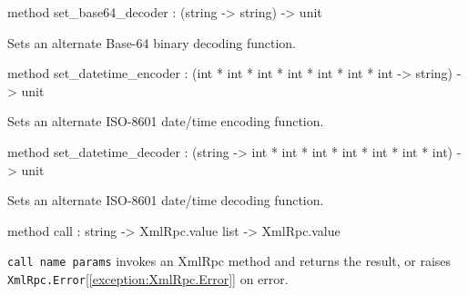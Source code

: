 \documentclass[11pt]{article}
\begin{document}
\begin{ocamldocobjectend}
\begin{ocamldocdescription}
\end{ocamldocdescription}


\label{method:XmlRpc.client.set-underscorebase64-underscoredecoder}\begin{ocamldoccode}
method set_base64_decoder : (string -> string) -> unit
\end{ocamldoccode}
\begin{ocamldocdescription}
Sets an alternate Base-64 binary decoding function.


\end{ocamldocdescription}


\label{method:XmlRpc.client.set-underscoredatetime-underscoreencoder}\begin{ocamldoccode}
method set_datetime_encoder :
  (int * int * int * int * int * int * int -> string) -> unit
\end{ocamldoccode}
\begin{ocamldocdescription}
Sets an alternate ISO-8601 date/time encoding function.


\end{ocamldocdescription}


\label{method:XmlRpc.client.set-underscoredatetime-underscoredecoder}\begin{ocamldoccode}
method set_datetime_decoder :
  (string -> int * int * int * int * int * int * int) -> unit
\end{ocamldoccode}
\begin{ocamldocdescription}
Sets an alternate ISO-8601 date/time decoding function.


\end{ocamldocdescription}


\label{method:XmlRpc.client.call}\begin{ocamldoccode}
method call : string -> XmlRpc.value list -> XmlRpc.value
\end{ocamldoccode}
\begin{ocamldocdescription}
{\tt{call name params}} invokes an XmlRpc method and returns the result,
      or raises {\tt{XmlRpc.Error}}[\ref{exception:XmlRpc.Error}] on error.


\end{ocamldocdescription}
\end{ocamldocobjectend}
\end{document}
